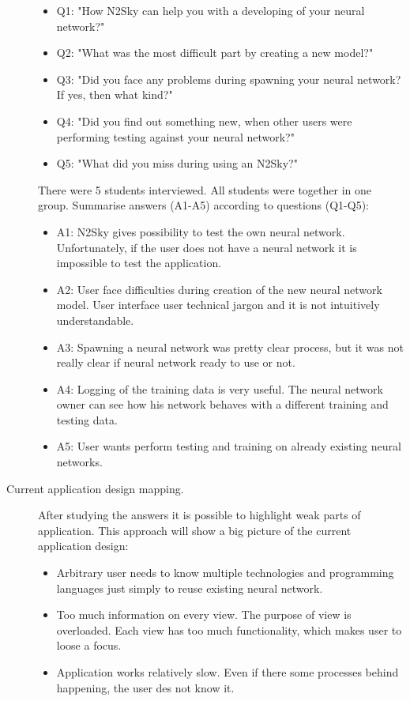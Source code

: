 \begin{description}
\begin{itemize}
\item Q1: "How N2Sky can help you with a developing of your neural network?"
\item Q2: "What was the most difficult part by creating a new model?"
\item Q3: "Did you face any problems during spawning your neural network? If yes, then what kind?"
\item Q4: "Did you find out something new, when other users were performing testing against your neural network?"
\item Q5: "What did you miss during using an N2Sky?"
\end{itemize}	

There were 5 students interviewed. All students were together in one group. Summarise answers (A1-A5) according to questions (Q1-Q5): 

\begin{itemize}
\item A1: N2Sky gives possibility to test the own neural network. Unfortunately, if the user does not have a neural network it is impossible to test the application.   
\item A2:  User face difficulties during creation of the new neural network model. User interface user technical jargon and it is not intuitively understandable.  
\item A3:  Spawning a neural network was pretty clear process, but it was not really clear if neural network ready to use or not.
\item A4:  Logging of the training data is very useful. The neural network owner can see how his network behaves with a different training and testing data.
\item A5:  User wants perform testing and training on already existing neural networks. 
\end{itemize}	


\item[Current application design mapping.]

After studying the answers it is possible to highlight weak parts of application. This approach will show a big picture of the current application design:

\begin{itemize}
\item Arbitrary user needs to know multiple technologies and programming languages just simply to reuse existing neural network. 
\item Too much information on every view. The purpose of view is overloaded. Each view has too much functionality, which makes user to loose a focus.
\item Application works relatively slow. Even if there some processes behind happening, the user des not know it.
\end{itemize}


\end{description}
